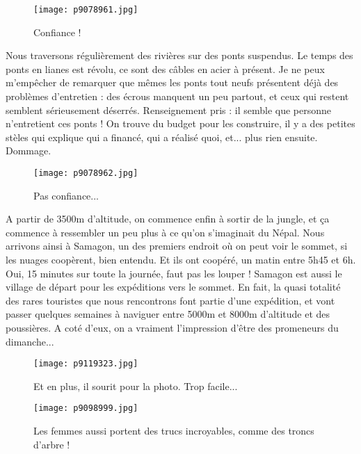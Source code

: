 \documentclass{book}
\begin{document}
\begin{figure}[h]
\centering
\texttt{[image: p9078961.jpg]}
\caption*{Confiance !}
\end{figure}

Nous traversons régulièrement des rivières sur des ponts suspendus. Le temps des ponts en lianes est révolu, ce sont des câbles en acier à présent. Je ne peux m'empêcher de remarquer que mêmes les ponts tout neufs présentent déjà des problèmes d'entretien : des écrous manquent un peu partout, et ceux qui restent semblent sérieusement déserrés. Renseignement pris : il semble que personne n'entretient ces ponts ! On trouve du budget pour les construire, il y a des petites stèles qui explique qui a financé, qui a réalisé quoi, et... plus rien ensuite. Dommage.


\begin{figure}[h]
\centering
\texttt{[image: p9078962.jpg]}
\caption*{Pas confiance...}
\end{figure}

A partir de 3500m d'altitude, on commence enfin à sortir de la jungle, et ça commence à ressembler un peu plus à ce qu'on s'imaginait du Népal. Nous arrivons ainsi à Samagon, un des premiers endroit où on peut voir le sommet, si les nuages coopèrent, bien entendu. Et ils ont coopéré, un matin entre 5h45 et 6h. Oui, 15 minutes sur toute la journée, faut pas les louper ! Samagon est aussi le village de départ pour les expéditions vers le sommet. En fait, la quasi totalité des rares touristes que nous rencontrons font partie d'une expédition, et vont passer quelques semaines à naviguer entre 5000m et 8000m d'altitude et des poussières. A coté d'eux, on a vraiment l'impression d'être des promeneurs du dimanche...


\begin{figure}[h]
\centering
\texttt{[image: p9119323.jpg]}
\caption*{Et en plus, il sourit pour la photo. Trop facile...}
\end{figure}


\begin{figure}[h]
\centering
\texttt{[image: p9098999.jpg]}
\caption*{Les femmes aussi portent des trucs incroyables, comme des troncs d'arbre !}
\end{figure}
\end{document}
